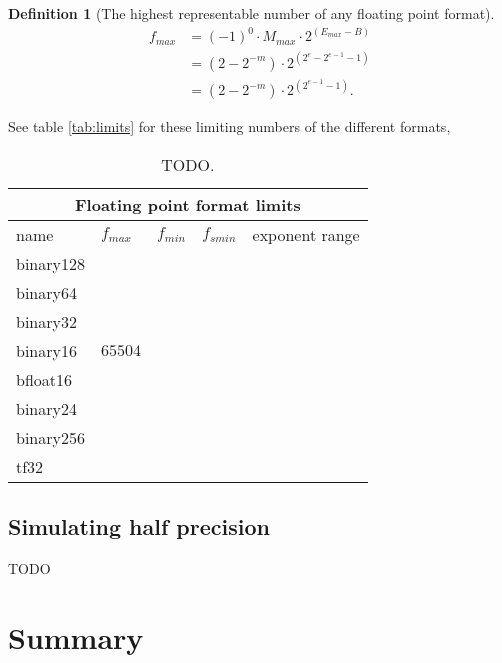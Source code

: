 \documentclass{article}
\theoremstyle{definition}
\newtheorem{definition}{Definition}[section]
\numberwithin{equation}{section}
\begin{document}
\begin{definition}[The highest representable number of any floating point format]

\begin{align*}
    f_{max} &= (-1)^0 \cdot M_{max} \cdot 2^{(E_{max} - B)} \\
            &= ( 2 - 2^{-m} ) \cdot 2^{(2^e -2^{e-1} -1)} \\
            &= ( 2 - 2^{-m} ) \cdot 2^{(2^{e-1} -1)}.
\end{align*}

See table \ref{tab:limits} for these limiting numbers of the different formats,

\begin{table}[H]
\centering

    \begin{tabular}{ |p{2cm}||p{1cm}|p{1cm}|p{1cm}|p{3cm}|  }
        \hline
        \multicolumn{5}{|c|}{Floating point format limits} \\
        \hline
        name & $f_{max}$ & $f_{min}$ & $f_{smin}$ & exponent range \\
        \hline
        binary128 & & & &  \\
        \gls{binary64}  & & & &  \\
        \gls{binary32}  & & & &  \\
        \gls{binary16}  & $65504$ & & &  \\
        \hline
        bfloat16  & & & & \\
        binary24  & & & &  \\
        binary256 & & & &  \\
        tf32      & & & &  \\
        \hline
    \end{tabular}
    
    \caption{\label{tab:formats} TODO.}
    
\end{table}

\end{definition}

\subsection{Simulating half precision}

TODO

\section{Summary}
\end{document}
